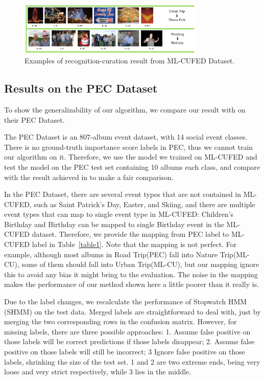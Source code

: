 \documentclass[runningheads]{llncs}
\begin{document}
\begin{figure}
\vspace{-0.15in}
\centering
\includegraphics[width=3.5in]{result-cufed}
\caption{Examples of recognition-curation result from ML-CUFED Dataset.}
\label{resultcufed}
\vspace{-0.3in}
\end{figure}


\subsection{Results on the PEC Dataset}
\label{PEC_section}
To show the generalizability of our algorithm, we compare our result with \cite{HMM} on their PEC Dataset.

The PEC Dataset is an 807-album event dataset, with 14 social event classes. There is no ground-truth importance score labels in PEC, thus we cannot train our algorithm on it. Therefore, we use the model we trained on ML-CUFED and test the model on the PEC test set containing 10 albums each class, and compare with the result achieved in \cite{HMM} to make a fair comparison.

In the PEC Dataset, there are several event types that are not contained in ML-CUFED, such as Saint Patrick's Day, Easter, and Skiing, and there are multiple event types that can map to single event type in ML-CUFED: Children's Birthday and Birthday can be mapped to single Birthday event in the ML-CUFED dataset. Therefore, we provide the mapping from PEC label to ML-CUFED label in Table~\ref{table1}. Note that the mapping is not perfect. For example, although most albums in Road Trip(PEC) fall into Nature Trip(ML-CU), some of them should fall into Urban Trip(ML-CU), but our mapping ignore this to avoid any bias it might bring to the evaluation. The noise in the mapping makes the performance of our method shown here a little poorer than it really is.

Due to the label changes, we recalculate the performance of Stopwatch HMM (SHMM) \cite{HMM} on the test data. Merged labels are straightforward to deal with, just by merging the two corresponding rows in the confusion matrix. However, for missing labels, there are three possible approaches: 1. Assume false positive on those labels will be correct predictions if those labels disappear; 2. Assume false positive on those labels will still be incorrect; 3 Ignore false positive on those labels, shrinking the size of the test set. 1 and 2 are two extreme ends, being very loose and very strict respectively, while 3 lies in the middle. 
\end{document}
